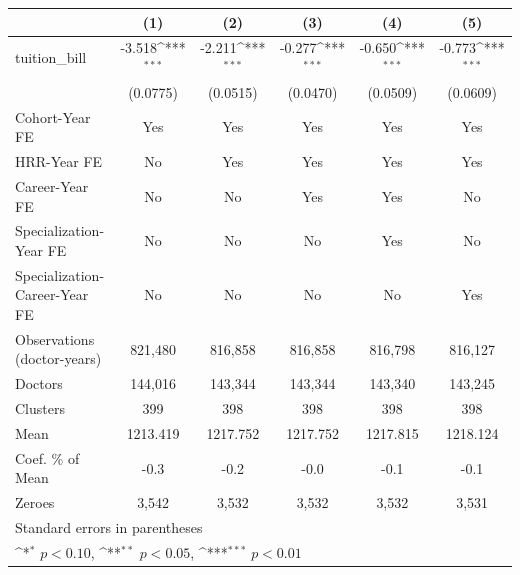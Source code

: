 {
\def\sym#1{\ifmmode^{#1}\else\(^{#1}\)\fi}
\begin{tabular}{l*{5}{c}}
\hline\hline
                    &\multicolumn{1}{c}{(1)}         &\multicolumn{1}{c}{(2)}         &\multicolumn{1}{c}{(3)}         &\multicolumn{1}{c}{(4)}         &\multicolumn{1}{c}{(5)}         \\
\hline
tuition\_bill        &      -3.518\sym{***}&      -2.211\sym{***}&      -0.277\sym{***}&      -0.650\sym{***}&      -0.773\sym{***}\\
                    &    (0.0775)         &    (0.0515)         &    (0.0470)         &    (0.0509)         &    (0.0609)         \\
[1em]
Cohort-Year FE      &         Yes         &         Yes         &         Yes         &         Yes         &         Yes         \\
[1em]
HRR-Year FE         &          No         &         Yes         &         Yes         &         Yes         &         Yes         \\
[1em]
Career-Year FE      &          No         &          No         &         Yes         &         Yes         &          No         \\
[1em]
Specialization-Year FE&          No         &          No         &          No         &         Yes         &          No         \\
[1em]
Specialization-Career-Year FE&          No         &          No         &          No         &          No         &         Yes         \\
\hline
Observations (doctor-years)&     821,480         &     816,858         &     816,858         &     816,798         &     816,127         \\
Doctors             &     144,016         &     143,344         &     143,344         &     143,340         &     143,245         \\
Clusters            &         399         &         398         &         398         &         398         &         398         \\
Mean                &    1213.419         &    1217.752         &    1217.752         &    1217.815         &    1218.124         \\
Coef. \% of Mean    &        -0.3         &        -0.2         &        -0.0         &        -0.1         &        -0.1         \\
Zeroes              &       3,542         &       3,532         &       3,532         &       3,532         &       3,531         \\
\hline\hline
\multicolumn{6}{l}{\footnotesize Standard errors in parentheses}\\
\multicolumn{6}{l}{\footnotesize \sym{*} \(p<0.10\), \sym{**} \(p<0.05\), \sym{***} \(p<0.01\)}\\
\end{tabular}
}
